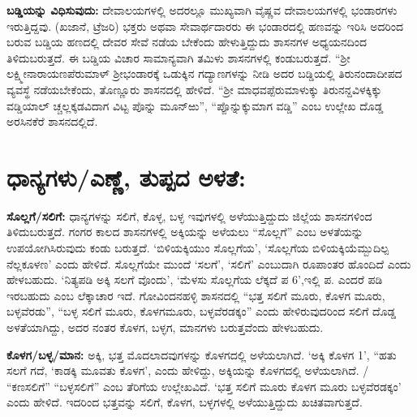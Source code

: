 \textbf{ಬಡ್ಡಿಯನ್ನು ವಿಧಿಸುವುದು:} ದೇವಾಲಯಗಳಲ್ಲಿ ಅದರಲ್ಲೂ ಮುಖ್ಯವಾಗಿ ವೈಷ್ಣವ ದೇವಾಲಯಗಳಲ್ಲಿ ಭಂಡಾರಗಳು ಇರುತ್ತಿದ್ದವು. (ಖಜಾನೆ, ಟ್ರೆಜರಿ) ಭಕ್ತರು ಅಥವಾ ಸೇವಾರ್ಥದಾರರು ಈ ಭಂಡಾರದಲ್ಲಿ ಹಣವನ್ನು ಇರಿಸಿ ಅದರಿಂದ ಬರುವ ಬಡ್ಡಿಯ ಹಣದಲ್ಲಿ ದೇವರ ಸೇವೆ ನಡೆಯ ಬೇಕೆಂದು ಹೇಳುತ್ತಿದ್ದುದು ಶಾಸನಗಳ ಅಧ್ಯಯನದಿಂದ ತಿಳಿದುಬರುತ್ತದೆ. ಈ ಬಡ್ಡಿಯ ವಿಚಾರ ಸಾಮಾನ್ಯವಾಗಿ ತಮಿಳು ಶಾಸನಗಳಲ್ಲಿ ಕಂಡುಬರುತ್ತದೆ. “ಶ‍್ರೀ ಲಕ್ಷ್ಮೀನಾರಾಯಣಪೆರುಮಾಳ್​ ಶ‍್ರೀಭಂಡಾರಕ್ಕೆ ಒಡುಕ್ಕಿನ ಗದ್ಯಾಣಗಳನ್ನು ನೀಡಿ ಅದರ ಬಡ್ಡಿಯಲ್ಲಿ ತಿರುನಂದಾದೀಪದ ವ್ಯವಸ್ಥೆ ನಡೆಯಬೇಕೆಂದು, ತೊಣ್ಣೂರು ಶಾಸನದಲ್ಲಿ ಹೇಳಿದೆ. “ಶ‍್ರೀ ಮಾಧವಪ್ಪೆರುಮಾಳುಕ್ಕು ತಿರುನನ್ದವಿಳಕ್ಕಿಕ್ಕು ವಡ್ಡಿಯಾಲ್​ ಚ್ಚಲ್ಲಕ್ಕಡವಿದಾಗ ವಿಟ್ಟ ಪೊನ್ನು ಮೂನ್​ಱು”, “ಪ್ಪೊನ್ನುಕ್ಕುಮಾಗ ವಡ್ಡಿ” ಎಂಬ ಉಲ್ಲೇಖ ದೊಡ್ಡ ಅರಸಿನಕೆರೆ ಶಾಸನದಲ್ಲಿದೆ.


\section{ಧಾನ್ಯಗಳು/ಎಣ್ಣೆ, ತುಪ್ಪದ ಅಳತೆ:}

\textbf{ಸೊಲ್ಲಗೆ/ಸಲಿಗೆ:} ಧಾನ್ಯಗಳನ್ನು ಸಲಿಗೆ, ಕೊಳ್ಳ, ಬಳ್ಳ ಇವುಗಳಲ್ಲಿ ಅಳೆಯುತ್ತಿದ್ದುದು ಜಿಲ್ಲೆಯ ಶಾಸನಗಳಿಂದ ತಿಳಿದುಬರುತ್ತದೆ. ಗಂಗರ ಕಾಲದ ಶಾಸನಗಳಲ್ಲಿ ಅಕ್ಕಿಯನ್ನು ಅಳೆಯಲು “ಸೊಲ್ಲಗೆ” ಎಂಬ ಅಳತೆಯನ್ನು ಉಪಯೋಗಿಸಿರುವುದು ಕಂಡು ಬರುತ್ತದೆ. ‘ಬಿಳಿಯಕ್ಕಿಯುಂ ಸೊಲ್ಲಗೆಯ’, ‘ಸೊಲ್ಲಗೆಯ ಬಿಳಿಯಕ್ಕಿಯೆಮ್ಬುದಿಲ್ಪ ನೆಲ್ಲಕೂಳಣ’ ಎಂದು ಹೇಳಿದೆ. ಸೊಲ್ಲಗೆಯೇ ಮುಂದೆ ‘ಸಲಗೆ’, ‘ಸಲಿಗೆ’ ಎಂಬುದಾಗಿ ರೂಪಾಂತರ ಹೊಂದಿದೆ ಎಂದು ಹೇಳಬಹುದು. ‘ನಿತ್ಯಪಡಿ ಅಕ್ಕಿ ಸಲಗೆ ವೊಂದು’, ‘ಮೆಳಸು ಸೊಲ್ಲಗೆಯ ಲೆಕ್ಕದೆ ಪ 6’,ಇಲ್ಲಿ ಪ. ಎಂದರೆ ಪಡಿ ಇರಬಹುದು ಎಂಬ ಲೆಕ್ಕಾಚಾರ ಇದೆ. ಗೋವಿಂದನಹಳ್ಳಿ ಶಾಸನದಲ್ಲಿ “ಭತ್ತ ಸಲಿಗೆ ಮೂರು, ಕೊಳಗ ಮೂರು, ಬಳ್ಳವೆರಡು”, “ಬಳ್ಳ ಸಲಿಗೆ ಮೂರು, ಕೊಳಗಮೂರು, ಬಳ್ಳವೆರಡಕ್ಕಂ” ಎಂದು ಹೇಳಿರುವುದರಿಂದ ಸಲಿಗೆ ದೊಡ್ಡ ಅಳತೆಯಾಗಿದ್ದು, ಅದರ ನಂತರ ಕೊಳಗ, ಬಳ್ಳಗ, ಮಾನಗಳು ಬರುತ್ತವೆಂದು ಹೇಳಬಹುದು.

\newpage

\textbf{ಕೊಳಗ/ಬಳ್ಳ/ಮಾನ:} ಅಕ್ಕಿ, ಭತ್ತ ಮೊದಲಾದವುಗಳನ್ನು ಕೊಳಗದಲ್ಲಿ ಅಳೆಯಲಾಗಿದೆ. ‘ಅಕ್ಕಿ ಕೊಳಗ 1’, “ಹತು ಸಲಗೆ ಗದೆ, ‘ಕಾಡಕ್ಕಿ ಮೂವತು ಕೊಳಗ’, ಎಂದು ಹೇಳಿದ್ದು, ಅಕ್ಕಿಯನ್ನು ಕೊಳಗದಲ್ಲಿ ಅಳೆಯಲಾಗಿದೆ. / “ಕಣಸಲಿಗೆ” “ಬಳ್ಳಸಲಿಗೆ” ಎಂಬ ತೆರಿಗೆಯ ಉಲ್ಲೇಖವಿದೆ. ‘ಭತ್ತ ಸಲಿಗೆ ಮೂರು ಕೊಳಗ ಮೂರು ಬಳ್ಳವೆರಡಕ್ಕಂ’ ಎಂದು ಹೇಳಿದೆ. ಇದರಿಂದ ಭತ್ತವನ್ನು ಸಲಿಗೆ, ಕೊಳಗ, ಬಳ್ಳಗಳಲ್ಲಿ ಅಳೆಯುತ್ತಿದ್ದುದು ಖಚಿತವಾಗುತ್ತದೆ.

